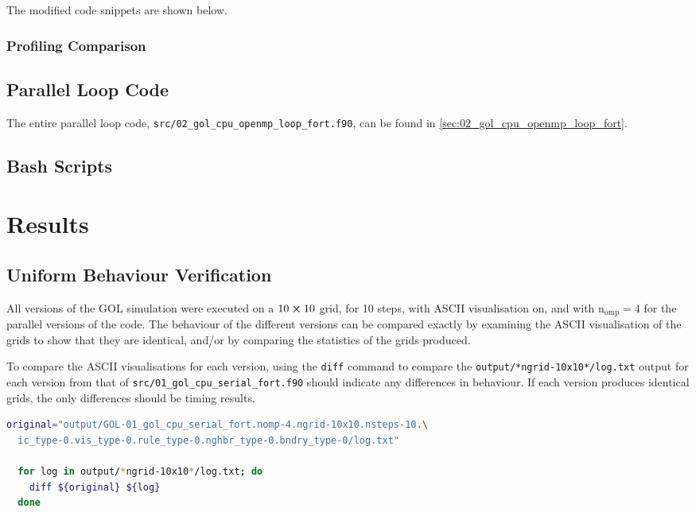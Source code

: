 \documentclass[]{article}
\begin{document}
The modified code snippets are shown below.





\subsubsection{Profiling Comparison}
\label{sec:profiling-comparison}

\subsection{Parallel Loop Code}
\label{sec:parallel-loop-code}

The entire parallel loop code,
\lstinline[style=ff]{src/02_gol_cpu_openmp_loop_fort.f90}, can be found in
\autoref{sec:02_gol_cpu_openmp_loop_fort}.

\subsection{Bash Scripts}
\label{sec:bash-scripts}

\newpage
\section{Results}
\label{sec:results}

\subsection{Uniform Behaviour Verification}
\label{sec:unif-behav-verif}

All versions of the GOL simulation were executed on a $10 \cross 10$ grid, for
10 steps, with ASCII visualisation on, and with $\mathrm{n_{omp}} = 4$ for the
parallel versions of the code.
The behaviour of the different versions can be compared exactly by examining the
ASCII visualisation of the grids to show that they are identical, and/or by
comparing the statistics of the grids produced.

To compare the ASCII visualisations for each version, using the \lstinline{diff}
command to compare the \lstinline[style=ff]{output/*ngrid-10x10*/log.txt} output
for each version from that of
\lstinline[style=ff]{src/01_gol_cpu_serial_fort.f90} should indicate any
differences in behaviour.
If each version produces identical grids, the only differences should be timing
results.
\begin{lstlisting}[language=Bash]
  original="output/GOL-01_gol_cpu_serial_fort.nomp-4.ngrid-10x10.nsteps-10.\
  ic_type-0.vis_type-0.rule_type-0.nghbr_type-0.bndry_type-0/log.txt"

  for log in output/*ngrid-10x10*/log.txt; do
    diff ${original} ${log}
  done
\end{lstlisting}
\end{document}
